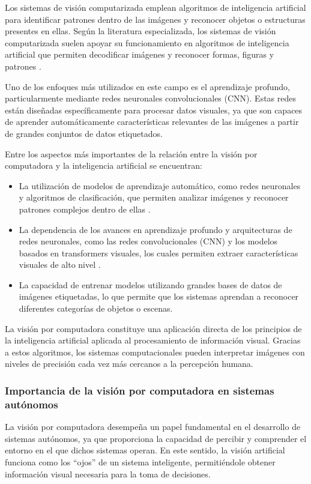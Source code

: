 Los sistemas de visión computarizada emplean algoritmos de inteligencia artificial para identificar patrones dentro de las imágenes y reconocer objetos o estructuras presentes en ellas. Según la literatura especializada, los sistemas de visión computarizada suelen apoyar su funcionamiento en algoritmos de inteligencia artificial que permiten decodificar imágenes y reconocer formas, figuras y patrones \cite{edsrobotics_vision}.

Uno de los enfoques más utilizados en este campo es el aprendizaje profundo, particularmente mediante redes neuronales convolucionales (CNN). Estas redes están diseñadas específicamente para procesar datos visuales, ya que son capaces de aprender automáticamente características relevantes de las imágenes a partir de grandes conjuntos de datos etiquetados.

Entre los aspectos más importantes de la relación entre la visión por computadora y la inteligencia artificial se encuentran:
\begin{itemize}
    \item La utilización de modelos de aprendizaje automático, como redes neuronales y algoritmos de clasificación, que permiten analizar imágenes y reconocer patrones complejos dentro de ellas \cite{ibm_computervision}\cite{edsrobotics_vision}.
    \item La dependencia de los avances en aprendizaje profundo y arquitecturas de redes neuronales, como las redes convolucionales (CNN) y los modelos basados en transformers visuales, los cuales permiten extraer características visuales de alto nivel \cite{fvivas_guia_cv}\cite{geeksforgeeks_object_detection}.
    \item La capacidad de entrenar modelos utilizando grandes bases de datos de imágenes etiquetadas, lo que permite que los sistemas aprendan a reconocer diferentes categorías de objetos o escenas.
\end{itemize}

La visión por computadora constituye una aplicación directa de los principios de la inteligencia artificial aplicada al procesamiento de información visual. Gracias a estos algoritmos, los sistemas computacionales pueden interpretar imágenes con niveles de precisión cada vez más cercanos a la percepción humana.

\subsubsection{Importancia de la visión por computadora en sistemas autónomos}
La visión por computadora desempeña un papel fundamental en el desarrollo de sistemas autónomos, ya que proporciona la capacidad de percibir y comprender el entorno en el que dichos sistemas operan. En este sentido, la visión artificial funciona como los “ojos” de un sistema inteligente, permitiéndole obtener información visual necesaria para la toma de decisiones.

